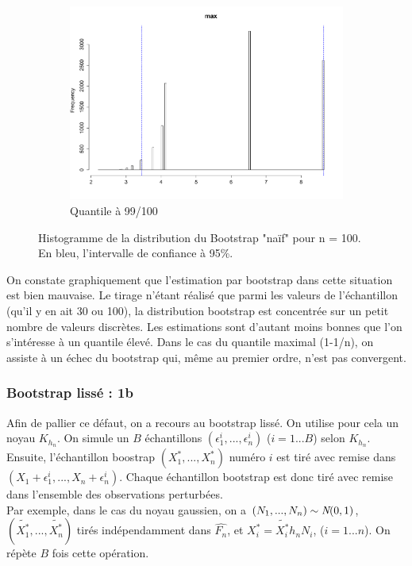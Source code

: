 \documentclass{article}
\renewcommand*{\(}{ \left( }
\renewcommand*{\)}{ \right) }
\begin{document}
\begin{figure}[H]
\begin{subfigure}[t]{0.3\textwidth}
        \includegraphics[width = \linewidth]{img/BootstrapNaif-Max-100.pdf}
        \caption{Quantile à 99/100}
        \label{fig:naifcBMax}
    \end{subfigure}%
    \caption{Histogramme de la distribution du Bootstrap "naïf" pour n = 100. En bleu, l'intervalle de confiance à 95\%.}
    \label{fig:naifB100}
\end{figure}

On constate graphiquement que l'estimation par bootstrap dans cette situation est bien mauvaise. Le tirage n'étant réalisé que parmi les valeurs de l'échantillon (qu'il y en ait 30 ou 100), la distribution bootstrap est concentrée sur un petit nombre de valeurs discrètes. Les estimations sont d'autant moins bonnes que l'on s'intéresse à un quantile élevé. Dans le cas du quantile maximal (1-1/n), on assiste à un échec du bootstrap qui, même au premier ordre, n'est pas convergent.

\subsubsection{Bootstrap lissé : 1b}
Afin de pallier ce défaut, on a recours au bootstrap lissé. On utilise pour cela un noyau $K_{h_n}$. On simule un $B$ échantillons $(\epsilon^{i}_1, ..., \epsilon^{i}_n)$ ($i=1...B$) selon $K_{h_n}$. Ensuite, l'échantillon boostrap $(X^*_1, ..., X^*_n)$ numéro $i$ est tiré avec remise dans $(X_1+\epsilon^{i}_1, ...,X_n+ \epsilon^{i}_n)$. Chaque échantillon bootstrap est donc tiré avec remise dans l'ensemble des observations perturbées.\\

Par exemple, dans le cas du noyau gaussien, on a $(N_1, ...,N_n) \sim \emph{N}(0,1)$, $(\tilde{X^*_1},...,\tilde{X^*_n})$ tirés indépendamment dans $\hat{F_n}$, et $X_i^* = \tilde{X^*_i}h_nN_i$, ($i=1...n$). On répète $B$ fois cette opération.\\
\end{document}
